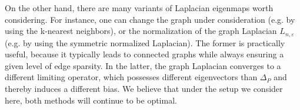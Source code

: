 \documentclass{article}
\newcommand{\1}{\mathbf{1}}
\theoremstyle{alden}
\theoremstyle{aldenthm}
\theoremstyle{definition}
\theoremstyle{remark}
\begin{document}
On the other hand, there are many variants of Laplacian eigenmaps worth considering. For instance, one can change the graph under consideration (e.g. by using the k-nearest neighbors), or the normalization of the graph Laplacian $L_{n,\varepsilon}$ (e.g. by using the symmetric normalized Laplacian). The former is practically useful, because it typically leads to connected graphs while always ensuring a given level of edge sparsity. In the latter, the graph Laplacian converges to a different limiting operator, which possesses different eigenvectors than $\Delta_P$ and thereby induces a different bias. We believe that under the setup we consider here, both methods will continue to be optimal.





 

\appendix


\end{document}
